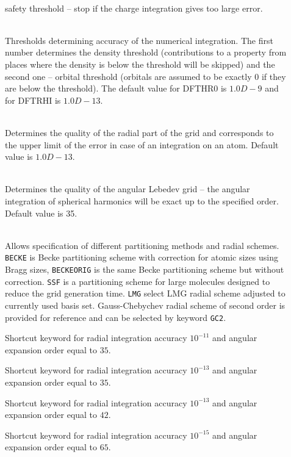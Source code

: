 \begin{description}
\item[]
   \\
  safety threshold -- stop if the charge integration gives too large
  error.

\item[]
   \\
  Thresholds determining accuracy of the numerical integration. The
  first number determines the density threshold (contributions to a
  property from places where the density is below the threshold will
  be skipped) and the second one -- orbital threshold (orbitals are
  assumed to be exactly 0 if they are below the threshold). The
  default value for DFTHR0 is $1.0D-9$ and for DFTRHI is $1.0D-13$.

\item[]
   \\

  Determines the quality of the radial part of the grid and
  corresponds to the upper limit of the error in case of an
  integration on an atom. Default value is $1.0D-13$.

\item[]
   \\
  Determines the quality of the angular Lebedev grid -- the angular
  integration of spherical harmonics will be exact up to the specified
  order. Default value is 35.
\item[]
   \\
  Allows specification of different partitioning methods and radial
  schemes. \verb|BECKE| is Becke partitioning scheme with correction
  for atomic sizes using Bragg sizes, \verb|BECKEORIG| is the same
  Becke partitioning scheme but without correction. \verb|SSF| is a
  partitioning scheme for large molecules designed to reduce the grid
  generation time. \verb|LMG| select LMG radial scheme adjusted to
  currently used basis set. Gauss-Chebychev radial scheme of second
  order is provided for reference and can be selected by keyword
  \verb|GC2|.

\item[]
  Shortcut keyword for radial integration accuracy $10^{-11}$ and
  angular expansion order equal to $35$.
\item[]
  Shortcut keyword for radial integration accuracy $10^{-13}$ and
  angular expansion order equal to $35$.
\item[]
  Shortcut keyword for radial integration accuracy $10^{-13}$ and
  angular expansion order equal to $42$.
\item[]
  Shortcut keyword for radial integration accuracy $10^{-15}$ and
  angular expansion order equal to $65$.

\end{description}

